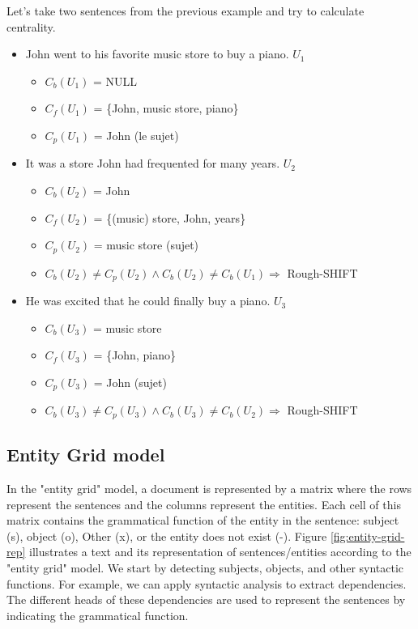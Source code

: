 \documentclass{KBook}
\begin{document}
Let's take two sentences from the previous example and try to calculate centrality.
\begin{itemize}
	\item John went to his favorite music store to buy a piano. $U_1$
	\begin{itemize}
		\item $C_b(U_1)$ = NULL
		\item $C_f(U_1)$ = \{John, music store, piano\}
		\item $C_p(U_1)$ = John (le sujet)
	\end{itemize}
	\item It was a store John had frequented for many years. $U_2$
	\begin{itemize}
		\item $C_b(U_2)$ = John
		\item $C_f(U_2)$ = \{(music) store, John, years\}
		\item $C_p(U_2)$ =  music store (sujet)
		\item $C_b(U_2) \ne C_p(U_2) \wedge C_b(U_2) \ne C_b(U_1) \Rightarrow$ Rough-SHIFT
	\end{itemize}
	\item He was excited that he could finally buy a piano. $U_3$
	\begin{itemize}
		\item $C_b(U_3)$ = music store
		\item $C_f(U_3)$ = \{John, piano\}
		\item $C_p(U_3)$ =  John (sujet)
		\item $C_b(U_3) \ne C_p(U_3) \wedge C_b(U_3) \ne C_b(U_2) \Rightarrow$ Rough-SHIFT
	\end{itemize}
\end{itemize}


\subsection{Entity Grid model}

In the "entity grid" model, a document is represented by a matrix where the rows represent the sentences and the columns represent the entities. Each cell of this matrix contains the grammatical function of the entity in the sentence: subject (s), object (o), Other (x), or the entity does not exist (-). Figure \ref{fig:entity-grid-rep} illustrates a text and its representation of sentences/entities according to the "entity grid" model. We start by detecting subjects, objects, and other syntactic functions. For example, we can apply syntactic analysis to extract dependencies. The different heads of these dependencies are used to represent the sentences by indicating the grammatical function.
\end{document}
